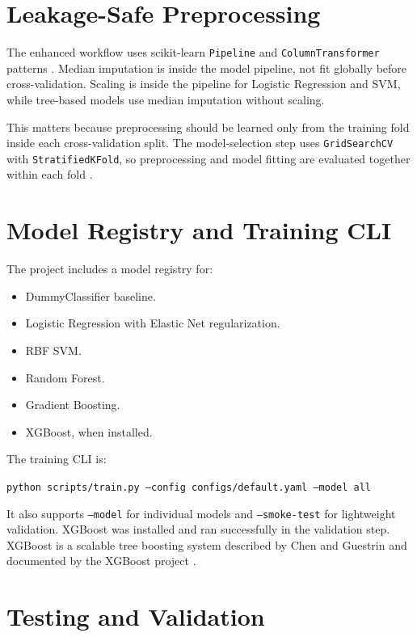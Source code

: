 \documentclass[11pt]{article}
\newcommand{\code}[1]{\texttt{#1}}
\begin{document}
\section{Leakage-Safe Preprocessing}

The enhanced workflow uses scikit-learn \code{Pipeline} and \code{ColumnTransformer} patterns \cite{sklearnPipeline,sklearnColumnTransformer}. Median imputation is inside the model pipeline, not fit globally before cross-validation. Scaling is inside the pipeline for Logistic Regression and SVM, while tree-based models use median imputation without scaling.

This matters because preprocessing should be learned only from the training fold inside each cross-validation split. The model-selection step uses \code{GridSearchCV} with \code{StratifiedKFold}, so preprocessing and model fitting are evaluated together within each fold \cite{sklearnCrossValidation,sklearnGridSearchCV}.

\section{Model Registry and Training CLI}

The project includes a model registry for:

\begin{itemize}
  \item DummyClassifier baseline.
  \item Logistic Regression with Elastic Net regularization.
  \item RBF SVM.
  \item Random Forest.
  \item Gradient Boosting.
  \item XGBoost, when installed.
\end{itemize}

The training CLI is:

\begin{center}
\code{python scripts/train.py --config configs/default.yaml --model all}
\end{center}

It also supports \code{--model} for individual models and \code{--smoke-test} for lightweight validation. XGBoost was installed and ran successfully in the validation step. XGBoost is a scalable tree boosting system described by Chen and Guestrin and documented by the XGBoost project \cite{chenGuestrin2016XGBoost,xgboostDocs}.

\section{Testing and Validation}
\end{document}
